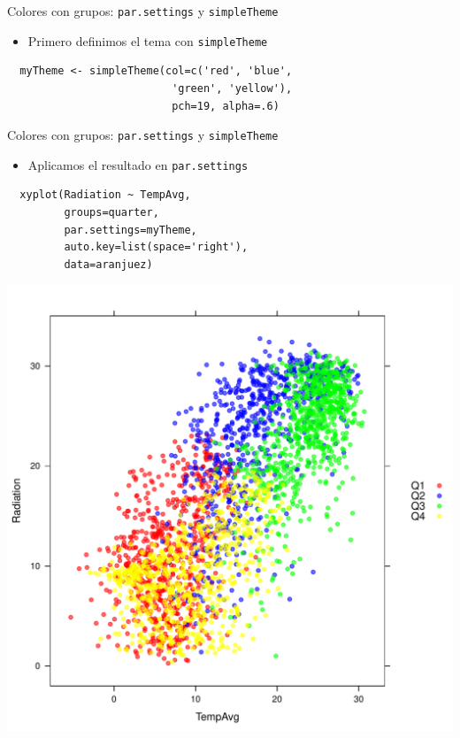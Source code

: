 \documentclass[xcolor={usenames,svgnames,dvipsnames}]{beamer}
\begin{document}
\begin{frame}[fragile,label=sec-6-1-14]{Colores con grupos: \texttt{par.settings} y \texttt{simpleTheme}}
 \begin{itemize}
\item Primero definimos el tema con \texttt{simpleTheme}
\end{itemize}
\lstset{language=R,label= ,caption= ,numbers=none}
\begin{lstlisting}
  myTheme <- simpleTheme(col=c('red', 'blue',
                          'green', 'yellow'),
                          pch=19, alpha=.6)
\end{lstlisting}
\end{frame}

\begin{frame}[fragile,label=sec-6-1-15]{Colores con grupos: \texttt{par.settings} y \texttt{simpleTheme}}
 \begin{itemize}
\item Aplicamos el resultado en \texttt{par.settings}
\end{itemize}
\lstset{language=R,label= ,caption= ,numbers=none}
\begin{lstlisting}
  xyplot(Radiation ~ TempAvg,
         groups=quarter,
         par.settings=myTheme,
         auto.key=list(space='right'),
         data=aranjuez)
\end{lstlisting}
\end{frame}

\begin{frame}[label=sec-6-1-16]{}
\includegraphics[width=.9\linewidth]{figs/myTheme.pdf}
\end{frame}
\end{document}

